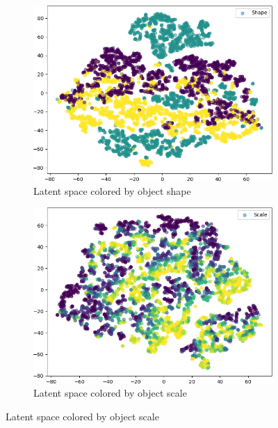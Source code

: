\documentclass{beamer}
\begin{document}
\begin{frame}
\begin{figure}
\centering
\begin{adjustbox}{valign=T}
\begin{subfigure}{.19\textwidth}
\includegraphics[width=\textwidth]{images/latent_spaces/dsprites/vae/embeddings_mu_0.png}
\caption{Latent space colored by object shape}
\end{subfigure}
\end{adjustbox}
\hfill
\begin{adjustbox}{valign=T}
\begin{subfigure}{.19\textwidth}
\includegraphics[width=\textwidth]{images/latent_spaces/dsprites/vae/embeddings_mu_1.png}
\caption{Latent space colored by object scale}

\end{subfigure}
\end{adjustbox}
\end{figure}
\end{frame}
\end{document}

